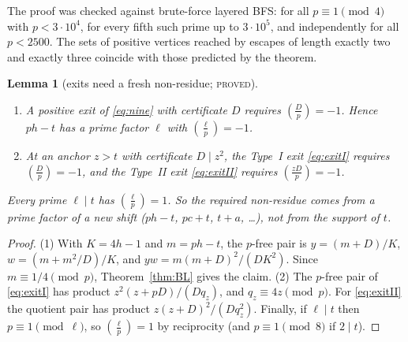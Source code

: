 \documentclass[11pt,reqno]{amsart}
\newtheorem{lemma}[theorem]{Lemma}
\theoremstyle{definition}
\newcommand{\leg}[2]{\left(\frac{#1}{#2}\right)}
\newcommand{\status}[1]{\textsc{#1}}
\begin{document}
The proof was checked against brute-force layered BFS: for all
$p\equiv1\pmod4$ with $p<3\cdot10^4$, for every fifth such prime up to
$3\cdot10^5$, and independently for all $p<2500$.  The sets of positive
vertices reached by escapes of length exactly two and exactly three
coincide with those predicted by the theorem.

\begin{lemma}[exits need a fresh non-residue; \status{proved}]\label{lem:fresh}
\leavevmode
\begin{enumerate}
\item A positive exit of \eqref{eq:nine} with certificate $D$ requires
$\leg Dp=-1$.  Hence $ph-t$ has a prime factor $\ell$ with $\leg\ell p=-1$.
\item At an anchor $z>t$ with certificate $D\mid z^2$, the Type~I exit
\eqref{eq:exitI} requires $\leg Dp=-1$, and the Type~II exit
\eqref{eq:exitII} requires $\leg{zD}p=-1$.
\end{enumerate}
Every prime $\ell\mid t$ has $\leg\ell p=1$.  So the required non-residue
comes from a prime factor of a new shift ($ph-t$, $pc+t$, $t+a$, \dots),
not from the support of $t$.
\end{lemma}

\begin{proof}
(1) With $K=4h-1$ and $m=ph-t$, the $p$-free pair is
$y=(m+D)/K$, $w=(m+m^2/D)/K$, and $yw=m(m+D)^2/(DK^2)$.  Since
$m\equiv1/4\pmod p$, Theorem~\ref{thm:BL} gives the claim.  (2) The
$p$-free pair of \eqref{eq:exitI} has product $z^2(z+pD)/(Dq_z)$, and
$q_z\equiv4z\pmod p$.  For \eqref{eq:exitII} the quotient pair has product
$z(z+D)^2/(Dq_z^2)$.  Finally, if $\ell\mid t$ then $p\equiv1\pmod\ell$,
so $\leg\ell p=1$ by reciprocity (and $p\equiv1\pmod8$ if $2\mid t$).
\end{proof}
\end{document}
